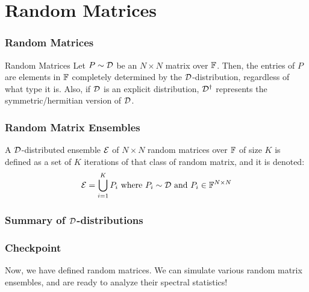 \section{Random Matrices}
\begin{frame} \frametitle{Random Matrices}

\begin{alertblock}{Random Matrices}
Let $P \sim \mathcal{D}$ be an $N \times N$ matrix over $\mathbb{F}$. Then, the entries of $P$ are elements in $\mathbb{F}$ completely determined by the $\mathcal{D}$-distribution, regardless of what type it is.
Also, if $\mathcal{D}$ is an explicit distribution, $\mathcal{D}^\dagger$ represents the symmetric/hermitian version of $\mathcal{D}$.
\end{alertblock}
\end{frame}

\begin{frame} \frametitle{Random Matrix Ensembles}

\begin{alertblock}{}
A $\mathcal{D}$-distributed ensemble $\mathcal{E}$ of $N \times N$ random matrices over $\mathbb{F}$ of size $K$ is defined as a set of $K$ iterations of that class of random matrix, and it is denoted:
$$ \mathcal{E} = \bigcup_{i = 1}^K P_i \text{ where } P_i \sim \mathcal{D} \text{ and } P_i \in \mathbb{F}^{N \times N} $$
\end{alertblock}

\end{frame}
\begin{frame} \frametitle{Summary of $\mathcal{D}$-distributions}
  \begin{center}
    \Ddisttable
  \end{center}
\end{frame}

\begin{frame} \frametitle{Checkpoint}

Now, we have defined random matrices. We can simulate various random matrix ensembles, and are ready to analyze their spectral statistics!
\end{frame}

